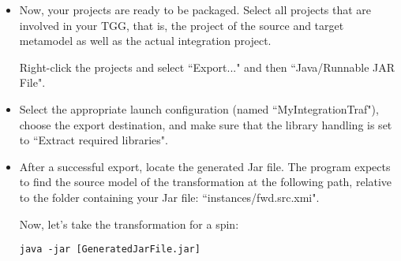 \begin{itemize}
\item 
Now, your projects are ready to be packaged.
Select all projects that are involved in your TGG, that is, the project of the source and target metamodel as well as the actual integration project.

Right-click the projects and select ``Export..." and then ``Java/Runnable JAR File".

\item 
Select the appropriate launch configuration (named ``MyIntegrationTraf"), choose the export destination, and make sure that the library handling is set to ``Extract required libraries".

\item 
After a successful export, locate the generated Jar file.
The program expects to find the source model of the transformation at the following path, relative to the folder containing your Jar file: ``instances/fwd.src.xmi".

Now, let's take the transformation for a spin:
\begin{lstlisting}
java -jar [GeneratedJarFile.jar]
\end{lstlisting}

\end{itemize}



   
